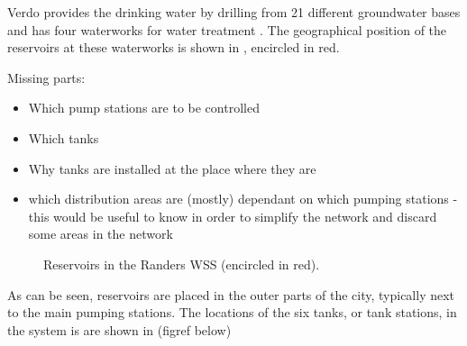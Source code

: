 Verdo provides the drinking water by drilling from 21 different groundwater bases and has four waterworks for water treatment \cite{verdo}. The geographical position of the reservoirs at these waterworks is shown in , encircled in red.   

Missing parts:
\begin{itemize}
  \item Which pump stations are to be controlled
  \item Which tanks 
  \item Why tanks are installed at the place where they are
  \item which distribution areas are (mostly) dependant on which pumping stations - this would be useful to know in order to simplify the network and discard some areas in the network 
\end{itemize}

\begin{figure}[H]
\centering
 
\caption{Reservoirs in the Randers WSS (encircled in red).}
\label{fig:reservoirs_epanet}
\end{figure}

As can be seen, reservoirs are placed in the outer parts of the city, typically next to the main pumping stations. The locations of the six tanks, or tank stations, in the system is are shown in (figref below)